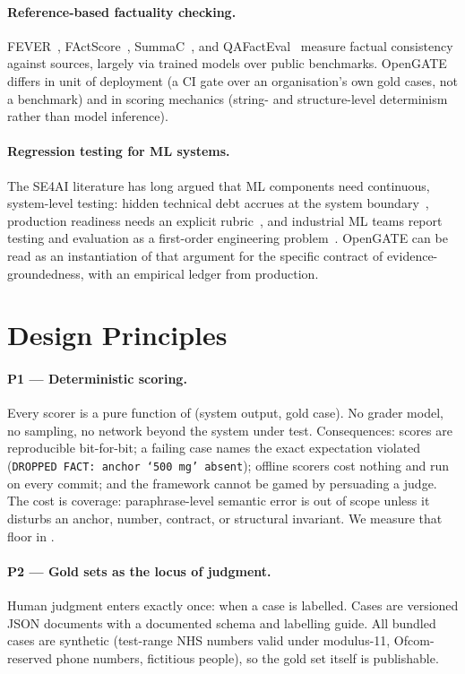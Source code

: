 \documentclass[11pt,a4paper]{article}
\begin{document}
\paragraph{Reference-based factuality checking.}
FEVER~\cite{thorne2018fever}, FActScore~\cite{min2023factscore}, SummaC~\cite{laban2022summac}, and
QAFactEval~\cite{fabbri2022qafacteval} measure factual consistency against sources, largely via
trained models over public benchmarks. OpenGATE differs in unit of deployment (a CI gate over an
organisation's own gold cases, not a benchmark) and in scoring mechanics (string- and
structure-level determinism rather than model inference).

\paragraph{Regression testing for ML systems.}
The SE4AI literature has long argued that ML components need continuous, system-level testing:
hidden technical debt accrues at the system boundary~\cite{sculley2015debt}, production readiness
needs an explicit rubric~\cite{breck2017mltest}, and industrial ML teams report testing and
evaluation as a first-order engineering problem~\cite{amershi2019se4ml}. OpenGATE can be read as an
instantiation of that argument for the specific contract of evidence-groundedness, with an empirical
ledger from production.

\section{Design Principles}

\paragraph{P1 --- Deterministic scoring.}
Every scorer is a pure function of (system output, gold case). No grader model, no sampling, no
network beyond the system under test. Consequences: scores are reproducible bit-for-bit; a failing
case names the exact expectation violated (\texttt{DROPPED FACT: anchor `500 mg' absent}); offline
scorers cost nothing and run on every commit; and the framework cannot be gamed by persuading a
judge. The cost is coverage: paraphrase-level semantic error is out of scope unless it disturbs an
anchor, number, contract, or structural invariant. We measure that floor in .

\paragraph{P2 --- Gold sets as the locus of judgment.}
Human judgment enters exactly once: when a case is labelled. Cases are versioned JSON documents with
a documented schema and labelling guide. All bundled cases are synthetic (test-range NHS numbers
valid under modulus-11, Ofcom-reserved phone numbers, fictitious people), so the gold set itself is
publishable.
\end{document}
